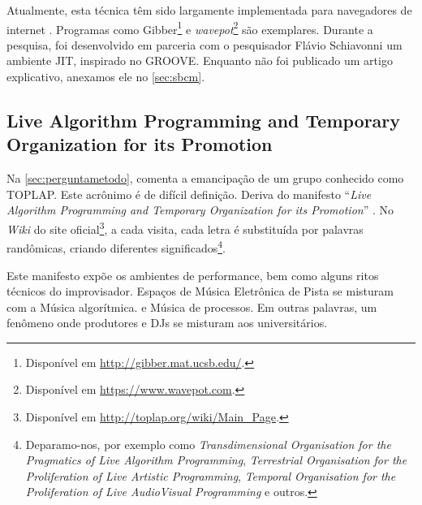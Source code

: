 Atualmente, esta técnica têm sido largamente implementada para navegadores de internet \cite{roberts_web_2013}. Programas como Gibber\footnote{Disponível em \url{http://gibber.mat.ucsb.edu/}.} \cite{roberts_gibber:_2012} e \emph{wavepot}\footnote{Disponível em \url{https://www.wavepot.com}.} são exemplares. Durante a pesquisa, foi desenvolvido em parceria com o pesquisador Flávio Schiavonni um ambiente JIT, inspirado no GROOVE. Enquanto não foi publicado um artigo explicativo, anexamos ele no \autoref{sec:sbcm}.

\subsection{Live Algorithm Programming and Temporary Organization for its Promotion}\label{sec:laptoptoplap}

Na \autoref{sec:perguntametodo},  comenta a emancipação de um grupo conhecido como TOPLAP. Este acrônimo é de difícil definição. Deriva  do manifesto ``\emph{Live Algorithm Programming and Temporary Organization for its Promotion}'' . No \emph{Wiki} do site oficial\footnote{Disponível em \url{http://toplap.org/wiki/Main_Page}.}, a cada visita, cada letra é substituída por palavras randômicas, criando diferentes significados\footnote{Deparamo-nos, por exemplo como \emph{Transdimensional Organisation for the Pragmatics of Live Algorithm Programming}, \emph{Terrestrial Organisation for the Proliferation of Live Artistic Programming}, \emph{Temporal Organisation for the Proliferation of Live AudioVisual Programming} e outros.}.

Este manifesto expõe os ambientes de performance, bem como alguns ritos técnicos do improvisador.  Espaços de Música Eletrônica de Pista se misturam com a Música algorítmica. e Música de processos. Em outras palavras, um fenômeno onde produtores e DJs se misturam aos universitários.


